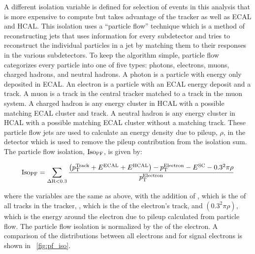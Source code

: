 A different isolation variable is defined for selection of events in this
analysis that is more expensive to compute but takes advantage of the tracker
as well as ECAL and HCAL. This isolation uses a
``particle flow'' \cite{particle_flow_2009}\cite{particle_flow_2010} technique which
is a method of reconstructing jets that uses information for every subdetector
and tries to reconstruct the individual particles in a jet by matching them to
their responses in the various subdetectors. To keep the algorithm simple,
particle flow categorizes every particle into one of five types: photons,
electrons, muons, charged hadrons, and neutral hadrons. A photon is a particle
with energy only deposited in ECAL. An electron is a particle with an ECAL
energy deposit and a track. A muon is a track in the central tracker matched to
a track in the muon system. A charged hadron is any energy cluster in HCAL with
a possible matching ECAL cluster and track. A neutral hadron is any energy
cluster in HCAL with a possible matching ECAL cluster without a matching track.
These particle flow jets are used to calculate an energy density due to pileup,
$\rho$, in the detector which is used to remove the pileup contribution from
the isolation sum. The particle flow isolation, $\text{Iso}_{\text{PF}}$, is given by:

\begin{equation}
    \text{Iso}_{\text{PF}} = \sum_{\Delta \text{R}<0.3} \frac{\left(p_{\mathrm{T}}^{\text{Track}} + E^{\text{ECAL}} + E^{\text{HCAL}}\right) - p_{\mathrm{T}}^{\text{Electron}}
    - E^{\text{SC}} - 0.3^{2} \pi \rho}{p_{\mathrm{T}}^{\text{Electron}}}
\end{equation}

\noindent where the variables are the same as above, with the addition of \ptTrack, which
is the \pt of all tracks in the tracker, \ptElectron, which is the \pt of the
electron's track, and $\left(0.3^{2} \pi \rho\right)$, which is the energy
around the electron due to pileup calculated from particle flow. The
particle flow isolation is normalized by the \pt of the electron. A comparison
of the \PFISO distributions between all electrons and for signal electrons is
shown in \FIG~\ref{fig:pf_iso}.

